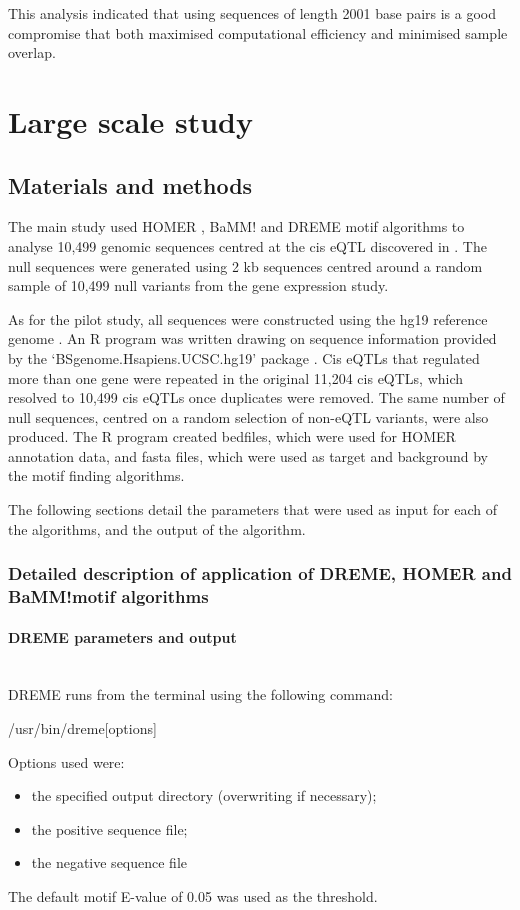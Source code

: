 \documentclass[12pt]{article}
\begin{document}
This analysis indicated that using sequences of length 2001 base pairs is a good compromise that both maximised computational efficiency and minimised sample overlap.
 

\section{Large scale study} 
\subsection{Materials and methods}

The main study used HOMER  \citep{heinz2010simple}, BaMM! \citep{siebert2016bayesian} and DREME \citep{bailey2011dreme} motif algorithms to analyse 10,499 genomic sequences centred at the cis eQTL discovered in \citet{lloyd2017genetic}. The null sequences were generated using 2 kb sequences centred around a random sample of 10,499 null variants from the \citet{lloyd2017genetic} gene expression study. 

As for the pilot study, all sequences were constructed using the hg19 reference genome \citep{Lander2001}. An R program was written drawing on sequence information provided by the `BSgenome.Hsapiens.UCSC.hg19' package \citep{TeamTBD2014}. Cis eQTLs that regulated more than one gene were repeated in the original 11,204 cis eQTLs, which resolved to 10,499 cis eQTLs once duplicates were removed. The same number of null sequences, centred on a random selection of non-eQTL variants, were also produced. The R program created bedfiles, which were used for HOMER annotation data, and fasta files, which were used as target and background by the motif finding algorithms.

The following sections detail the parameters that were used as input for each of the algorithms, and the output of the algorithm.

\subsubsection{Detailed description of application of DREME, HOMER and  BaMM!motif algorithms}



\paragraph{DREME parameters and output}\mbox{}\\
DREME runs from the terminal using the following command:
\begin{center}
/usr/bin/dreme[options]
\end{center}
Options used were:
\begin{itemize}
\item the specified output directory (overwriting if necessary);
\item the positive sequence file; 
\item the negative sequence file
\end{itemize}
The default motif E-value of 0.05 was used as the threshold.
\end{document}
